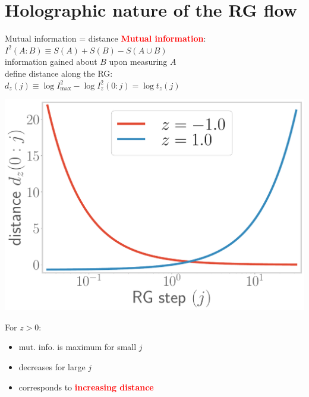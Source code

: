 \documentclass[11pt,aspectratio=169]{beamer}
\newcommand{\focus}[1]{\textcolor{red}{\bf{#1}}}
\begin{document}
\section{Holographic nature of the RG flow}
\begin{frame}{Mutual information = distance}
	\focus{Mutual information}: ~ \(I^2(A:B) \equiv S(A) + S(B) - S(A \cup B)\)\\[10pt]
	information gained about \(B\) upon measuring \(A\)\\[10pt]
	define distance along the RG: ~ ~ \(d_z(j) \equiv \log I^2_\text{max} - \log I_z^2(0:j) = \log t_z(j)\)

	\vspace*{\fill}

	\begin{minipage}{0.4\textwidth}
	\includegraphics[width=\textwidth]{figures/distance1.pdf}
	\end{minipage}
	\hspace*{\fill}
	\begin{minipage}{0.55\textwidth}
		\centering
		For \(z > 0\):
		\begin{itemize}
			\item mut. info. is maximum for small \(j\)\\
			\item decreases for large \(j\)\\
			\item corresponds to \focus{increasing distance}
		\end{itemize}
	\end{minipage}
\end{frame}
\end{document}
